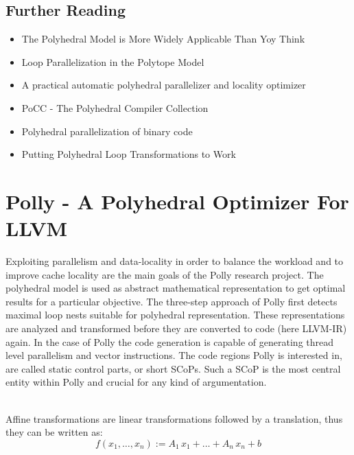 \subsection*{Further Reading}
\begin{itemize}
  \item The Polyhedral Model is More Widely Applicable Than Yoy Think \cite{BPCB10}
  \item Loop Parallelization in the Polytope Model \cite{Lengauer93loopparallelization}  
  \item A practical automatic polyhedral parallelizer and locality optimizer \cite{Bondhugula:2008:PAP:1379022.1375595}
  \item PoCC - The Polyhedral Compiler Collection \cite{PoCC:Online}
  \item Polyhedral parallelization of binary code \cite{Pradelle:2012:PPB:2086696.2086718}
  \item Putting Polyhedral Loop Transformations to Work \cite{BCGST03} 
\end{itemize}

\clearpage

\section{Polly - A Polyhedral Optimizer For LLVM}
\label{Polly}
Exploiting parallelism and data-locality in order to balance the workload
and to improve cache locality are the main goals of the Polly research project.
The polyhedral model is used as abstract mathematical representation to get optimal
results for a particular objective. The three-step approach of Polly first detects
maximal loop nests suitable for polyhedral representation. These representations
are analyzed and transformed before they are converted to code (here LLVM-IR)
again. In the case of Polly the code generation is capable of generating thread 
level parallelism and vector instructions. The code regions Polly is interested 
in, are called static control parts, or short SCoPs. Such a SCoP is 
the most central entity within Polly and crucial for any kind of argumentation.

\begin{definition} ~\\
  Affine transformations are linear transformations followed by a translation,
  thus they can be written as:
  \[ f(x_1,\dots,x_n) := A_1\, x_1 + \dots + A_n\, x_n + b\]

  \label{def:AffineTransformation}
\end{definition}

